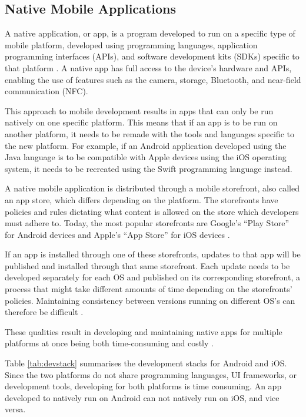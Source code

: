 \documentclass[a4paper,12pt]{article}
\begin{document}
\subsection{Native Mobile Applications}
\label{Theory_nativeApps}
A native application, or app, is a program developed to run on a specific type of mobile platform, developed using programming languages, application programming interfaces (APIs), and software development kits (SDKs) specific to that platform \cite{crossplatform_taxonomy, mobile_web_apps_2013}. A native app has full access to the device’s hardware and APIs, enabling the use of features such as the camera, storage, Bluetooth, and near-field communication (NFC).

This approach to mobile development results in apps that can only be run natively on one specific platform. This means that if an app is to be run on another platform, it needs to be remade with the tools and languages specific to the new platform. For example, if an Android application developed using the Java language is to be compatible with Apple devices using the iOS operating system, it needs to be recreated using the Swift programming language instead.

A native mobile application is distributed through a mobile storefront, also called an app store, which differs depending on the platform. The storefronts have policies and rules dictating what content is allowed on the store which developers must adhere to. Today, the most popular storefronts are  Google’s “Play Store” for Android devices and Apple’s “App Store” for iOS devices \cite{numofapps_in_stores}.

If an app is installed through one of these storefronts, updates to that app will be published and installed through that same storefront. Each update needs to be developed separately for each OS and published on its corresponding storefront, a process that might take different amounts of time depending on the storefronts’ policies. Maintaining consistency between versions running on different OS’s can therefore be difficult \cite{comp_mobile_apps_crossplatform}.

These qualities result in developing and maintaining native apps for multiple platforms at once being both time-consuming and costly \cite{mobile_web_apps_2013}.

Table \ref{tab:devstack} summarises the development stacks for Android and iOS. Since the two platforms do not share programming languages, UI frameworks, or development tools, developing for both platforms is time consuming. An app developed to natively run on Android can not natively run on iOS, and vice versa.
\end{document}

